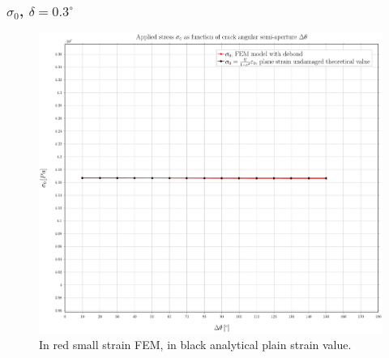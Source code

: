\documentclass[first,firstsupp,lastsupp,handout,last,hyperref,table]{ETHclass}
\begin{document}
\begin{frame}
\frametitle{\small $\sigma_{0}$, $\delta=0.3^{\circ}$}
\vspace{-0.5cm}
\centering
\captionsetup[figure]{font=scriptsize,labelfont=scriptsize}
\begin{figure}[!h]
\centering
\includegraphics[height=0.7\textheight]{2017-07-10_AbqRunSummary_SmallStrainD03_sigma-inf_Summary.pdf}
  \caption{\scriptsize In red small strain FEM, in black analytical plain strain value.}
  \label{fig:res1}
\end{figure}
\end{frame}
\end{document}
